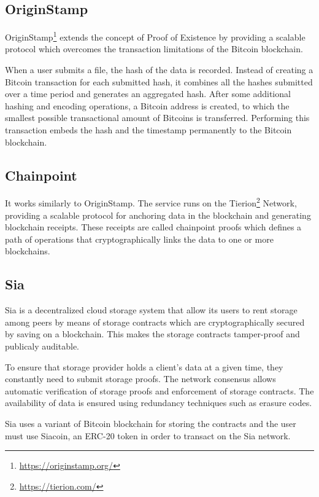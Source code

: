 \documentclass[]{report}
\begin{document}
		\subsection*{OriginStamp}
			OriginStamp\footnote{\url{https://originstamp.org/}} extends the concept of Proof of Existence by providing a scalable protocol which overcomes the transaction limitations of the Bitcoin blockchain.
			
			When a user submits a file, the hash of the data is recorded. Instead of creating a Bitcoin transaction for each submitted hash, it combines all the hashes submitted over a time period and generates an aggregated hash. After some additional hashing and encoding operations, a Bitcoin address is created, to which the smallest possible transactional amount of Bitcoins is transferred. Performing this transaction embeds the hash and the timestamp permanently to the Bitcoin blockchain.
			
		\subsection*{Chainpoint}
			It works similarly to OriginStamp. The service runs on the Tierion\footnote{\url{https://tierion.com/}} Network, providing a scalable protocol for anchoring data in the blockchain and generating blockchain receipts. These receipts are called chainpoint proofs which defines a path of operations that cryptographically links the data to one or more blockchains.
			
		\subsection*{Sia}
			Sia\cite{vorick2014sia} is a decentralized cloud storage system that allow its users to rent storage among peers by means of storage contracts which are cryptographically secured by saving on a blockchain. This makes the storage contracts tamper-proof and publicaly auditable.
			
			To ensure that storage provider holds a client’s data at a given time, they constantly need to submit storage proofs. The network consensus allows automatic verification of storage proofs and enforcement of storage contracts. The availability of data is ensured using redundancy techniques such as erasure codes.
			
			Sia uses a variant of Bitcoin blockchain for storing the contracts and the user must use Siacoin, an ERC-20 token in order to transact on the Sia network.
		
\end{document}
